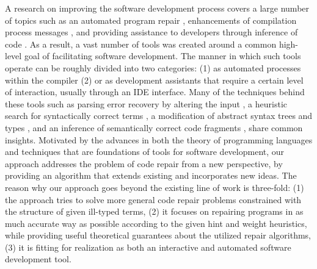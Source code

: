 A research on improving the software development process covers a large number of topics such as an automated
program repair
\cite{LeGoues:2012:ROI:2330163.2330296,WeiETAL10AutomatedFixingProgramsContracts,PeiETAL11CodebasedAutomatedProgramFixing},
enhancements of compilation process messages
\cite{Burke87apractical,Hammond198451,Lerner:2007:STM:1250734.1250783}, and
providing assistance to developers through inference of code
\cite{GveroETAL13CompleteCompletionTypesWeights,MandelinetALL2005Jungloid,KneussETAL13SynthesisModuloRecursiveFunctions,KuncakETAL13ExecutingSpecificationsSynthesisConstraintSolvingInvitedTalk,PerelmanGBG12}.
As a result, a vast number of tools was created around a common
high-level goal of facilitating software development.
The manner in which such tools operate can be roughly divided into two
categories: (1) as automated processes within the compiler 
(2) or as development assistants that require a certain level of
interaction, usually through an IDE interface.
Many of the techniques behind these tools such as parsing error recovery by altering the
input \cite{Burke87apractical}, a heuristic search for syntactically
correct terms \cite{PerelmanGBG12}, a modification of
abstract syntax trees and types \cite{Lerner:2007:STM:1250734.1250783}, and an inference
of semantically correct code fragments
\cite{KneussETAL13SynthesisModuloRecursiveFunctions}, share common insights.
Motivated by the advances in both the theory of programming languages and
techniques that are foundations of tools for software development, our
approach addresses the problem of code repair from a new perspective,
by providing an algorithm that extends existing and incorporates new
ideas. The reason why our approach goes beyond the existing line of
work is three-fold: (1) the approach tries to solve more general code
repair problems constrained with the structure of given ill-typed
terms, (2) it focuses on repairing programs in as much accurate way as
possible according to the given hint and weight heuristics, while
providing useful theoretical guarantees about the utilized repair
algorithms, (3) it is fitting for realization as both an interactive
and automated software development tool.

